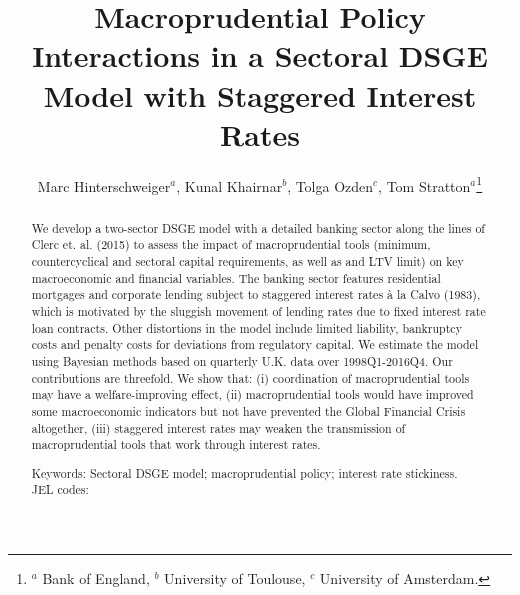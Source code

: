 \documentclass[12pt]{article}
\title{Macroprudential Policy Interactions in a Sectoral DSGE Model with Staggered Interest Rates}
\author{Marc Hinterschweiger$^{a}$, Kunal Khairnar$^{b}$, Tolga Ozden$^{c}$, Tom Stratton$^{a}$\footnote{$^{a}$ Bank of England, $^{b}$ University of Toulouse, $^{c}$ University of Amsterdam.}}
\numberwithin{equation}{section}
\begin{document}
\maketitle



\begin{abstract}

We develop a two-sector DSGE model with a detailed banking sector along the lines of Clerc et. al. (2015) to assess the impact of macroprudential tools (minimum, countercyclical and sectoral capital requirements, as well as and LTV limit) on key macroeconomic and financial variables. The banking sector features residential mortgages and corporate lending subject to staggered interest rates à la Calvo (1983), which is motivated by the sluggish movement of lending rates due to fixed interest rate loan contracts. Other distortions in the model include limited liability, bankruptcy costs and penalty costs for deviations from regulatory capital. We estimate the model using Bayesian methods based on quarterly U.K. data over 1998Q1-2016Q4. Our contributions are threefold. We show that: (i) coordination of macroprudential tools may have a welfare-improving effect, (ii) macroprudential tools would have improved some macroeconomic indicators but not have prevented the Global Financial Crisis altogether, (iii) staggered interest rates may weaken the transmission of macroprudential tools that work through interest rates. 

\noindent

\vspace{3 mm}
Keywords: Sectoral DSGE model; macroprudential policy; interest rate stickiness. \\
\noindent 
\vspace{3 mm}
JEL codes: 


	
\end{abstract}
\noindent\vspace{3 mm}
\end{document}
